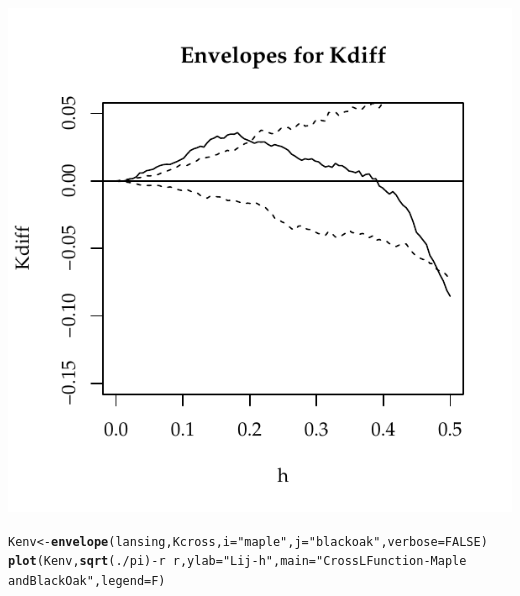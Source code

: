 \documentclass{article}\usepackage[]{graphicx}\usepackage[]{color}
\makeatletter
\def\maxwidth{ %
  \ifdim\Gin@nat@width>\linewidth
    \linewidth
  \else
    \Gin@nat@width
  \fi
}
\newcommand{\hlnum}[1]{\textcolor[rgb]{0.686,0.059,0.569}{#1}}%
\newcommand{\hlstr}[1]{\textcolor[rgb]{0.192,0.494,0.8}{#1}}%
\newcommand{\hlopt}[1]{\textcolor[rgb]{0,0,0}{#1}}%
\newcommand{\hlstd}[1]{\textcolor[rgb]{0.345,0.345,0.345}{#1}}%
\newcommand{\hlkwb}[1]{\textcolor[rgb]{0.69,0.353,0.396}{#1}}%
\newcommand{\hlkwc}[1]{\textcolor[rgb]{0.333,0.667,0.333}{#1}}%
\newcommand{\hlkwd}[1]{\textcolor[rgb]{0.737,0.353,0.396}{\textbf{#1}}}%
\newenvironment{kframe}{%
 \def\at@end@of@kframe{}%
 \ifinner\ifhmode%
  \def\at@end@of@kframe{\end{minipage}}%
  \begin{minipage}{\columnwidth}%
 \fi\fi%
 \def\FrameCommand##1{\hskip\@totalleftmargin \hskip-\fboxsep
 \colorbox{shadecolor}{##1}\hskip-\fboxsep
     \hskip-\linewidth \hskip-\@totalleftmargin \hskip\columnwidth}%
 \MakeFramed {\advance\hsize-\width
   \@totalleftmargin\z@ \linewidth\hsize
   \@setminipage}}%
 {\par\unskip\endMakeFramed%
 \at@end@of@kframe}
\newenvironment{knitrout}{}{} %
\makeatother
\begin{document}
\begin{enumerate}
\begin{enumerate}
\begin{knitrout}
{\centering \includegraphics[width=\maxwidth]{figure/prob3c-3} 

}


\begin{kframe}\begin{alltt}
\hlstd{Kenv}\hlkwb{<-}\hlkwd{envelope}\hlstd{(lansing,Kcross,} \hlkwc{i}\hlstd{=}\hlstr{"maple"}\hlstd{,}\hlkwc{j}\hlstd{=}\hlstr{"blackoak"}\hlstd{,} \hlkwc{verbose} \hlstd{=} \hlnum{FALSE}\hlstd{)}
\hlkwd{plot}\hlstd{(Kenv,}\hlkwd{sqrt}\hlstd{(.}\hlopt{/}\hlstd{pi)}\hlopt{-}\hlstd{r}\hlopt{~}\hlstd{r,}\hlkwc{ylab}\hlstd{=}\hlstr{"Lij - h"}\hlstd{,}\hlkwc{main}\hlstd{=}\hlstr{"Cross L Function - Maple
and Black Oak"}\hlstd{,}\hlkwc{legend}\hlstd{=F)}
\end{alltt}
\end{kframe}


\end{knitrout}
\end{enumerate}
\end{enumerate}
\end{document}

